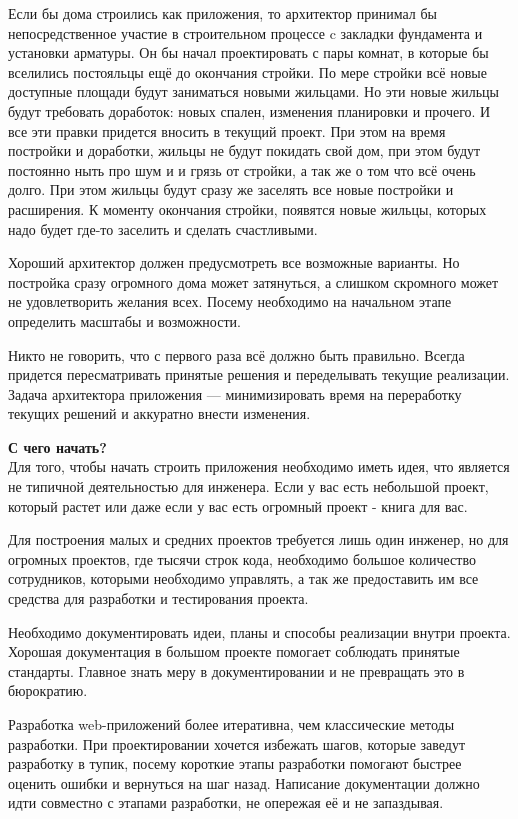 
Если бы дома строились как приложения, то архитектор принимал бы непосредственное участие в строительном процессе c закладки фундамента и установки арматуры.  Он бы начал проектировать с пары комнат, в которые бы вселились постояльцы ещё до окончания стройки. По мере стройки всё новые доступные площади будут заниматься новыми жильцами. Но эти новые жильцы будут требовать доработок: новых спален, изменения планировки и прочего. И все эти правки придется вносить в текущий проект. При этом на время постройки и доработки, жильцы не будут покидать свой дом, при этом будут постоянно ныть про шум и и грязь от стройки, а так же о том что всё очень долго. При этом жильцы будут сразу же заселять все новые постройки и расширения. К моменту окончания стройки, появятся новые жильцы, которых надо будет где-то заселить и сделать счастливыми.

Хороший архитектор должен предусмотреть все возможные варианты. Но постройка сразу огромного дома может затянуться, а слишком скромного может не удовлетворить желания всех. Посему необходимо на начальном этапе определить масштабы и возможности.

Никто не говорить, что с первого раза всё должно быть правильно. Всегда придется пересматривать принятые решения и переделывать текущие реализации. Задача архитектора приложения --- минимизировать время на переработку текущих решений и аккуратно внести изменения.

\textbf{С чего начать?}\\

Для того, чтобы начать строить приложения необходимо иметь идея, что является не типичной деятельностью для инженера. Если у вас есть небольшой проект, который растет или даже если у вас есть огромный проект - книга для вас.

Для построения малых и средних проектов требуется лишь один инженер, но для огромных проектов, где тысячи строк кода, необходимо большое количество сотрудников, которыми необходимо управлять, а так же предоставить им все средства для разработки и тестирования проекта. 


Необходимо документировать идеи, планы и способы реализации внутри проекта. Хорошая документация в большом проекте помогает соблюдать принятые стандарты. Главное знать меру в документировании и не превращать это в бюрократию.

Разработка web-приложений более итеративна, чем классические методы разработки.  При проектировании хочется избежать шагов, которые заведут разработку в тупик, посему короткие этапы разработки помогают быстрее оценить ошибки и вернуться на шаг назад. Написание документации должно идти совместно с этапами разработки, не опережая её и не запаздывая.







\clearpage